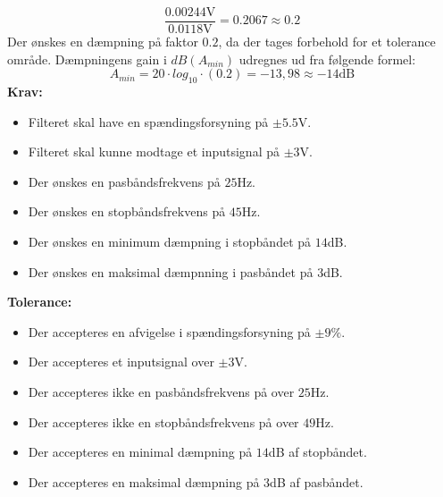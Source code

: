 \begin{equation}
\dfrac{0.00244\text{V}}{0.0118\text{V}} = 0.2067  \approx 0.2
\end{equation}
Der ønskes en dæmpning på faktor $0.2$, da der tages forbehold for et tolerance område. Dæmpningens gain i $dB(A_{min})$ udregnes ud fra følgende formel:   
\begin{equation}
\label{eq:daempningsfaktoridB}
A_{min}=20 \cdot log_{10} \cdot (0.2) = -13,98 \approx -14\text{dB}
\end{equation}
\textbf{Krav:}
\begin{itemize}
	\item Filteret skal have en spændingsforsyning på $\pm5.5$V.
	\item Filteret skal kunne modtage et inputsignal på $\pm3$V.
	\item Der ønskes en pasbåndsfrekvens på $25$Hz.
	\item Der ønskes en stopbåndsfrekvens på $45$Hz.
	\item Der ønskes en minimum dæmpning i stopbåndet på $14$dB.
	\item Der ønskes en maksimal dæmpnning i pasbåndet på $3$dB.
\end{itemize}
\noindent \textbf{Tolerance:}
\begin{itemize}
	\item Der accepteres en afvigelse i spændingsforsyning på $\pm9\%$.
	\item Der accepteres et inputsignal over $\pm3$V.
	\item Der accepteres ikke en pasbåndsfrekvens på over $25$Hz.
	\item Der accepteres ikke en stopbåndsfrekvens på over $49$Hz.
	\item Der accepteres en minimal dæmpning på $14$dB af stopbåndet.
	\item Der accepteres en maksimal dæmpning på $3$dB af pasbåndet.
\end{itemize}
